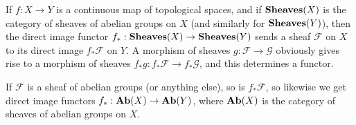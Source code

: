 \documentclass{article}
\begin{document}
If $f : X\to Y$ is a continuous map of topological spaces, and if ${\bf Sheaves}(X)$ is the category of sheaves of abelian groups on $X$ (and similarly for ${\bf Sheaves}(Y)$), then the direct image functor $f_* : {\bf Sheaves}(X)\to {\bf Sheaves}(Y)$ sends a sheaf $\mathcal{F}$ on $X$ to its direct image $f_*\mathcal{F}$ on $Y$.  A morphism of sheaves $g : \mathcal{F}\to\mathcal{G}$ obviously gives rise to a morphism of sheaves $f_* g : f_*\mathcal{F}\to f_*\mathcal{G}$, and this determines a functor.

If $\mathcal{F}$ is a sheaf of abelian groups (or anything else), so is $f_*\mathcal{F}$, so likewise we get direct image functors $f_* : {\bf Ab}(X)\to {\bf Ab}(Y)$, where ${\bf Ab}(X)$ is the category of sheaves of abelian groups on $X$.
\end{document}
